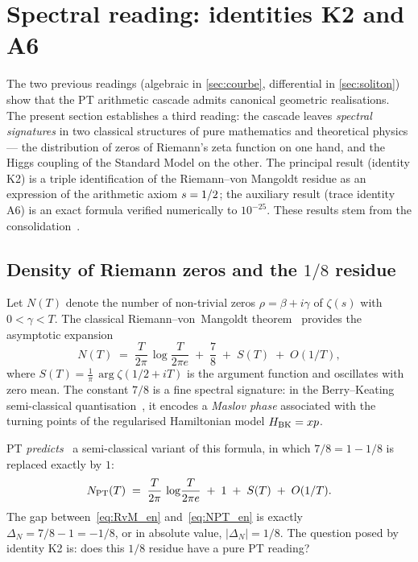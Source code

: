 \section{Spectral reading: identities K2 and A6}
\label{sec:spectrales}

The two previous readings (algebraic in \ref{sec:courbe}, differential in \ref{sec:soliton}) show that the PT arithmetic cascade admits canonical geometric realisations. The present section establishes a third reading: the cascade leaves \emph{spectral signatures} in two classical structures of pure mathematics and theoretical physics --- the distribution of zeros of Riemann's zeta function on one hand, and the Higgs coupling of the Standard Model on the other. The principal result (identity K2) is a triple identification of the Riemann--von Mangoldt residue as an expression of the arithmetic axiom $s = 1/2$; the auxiliary result (trace identity A6) is an exact formula verified numerically to $10^{-25}$. These results stem from the consolidation~\cite{PT_NewMath_Consolidation}.

\subsection{Density of Riemann zeros and the \texorpdfstring{$1/8$}{1/8} residue}
\label{sec:spectrales:RvM}

Let $N(T)$ denote the number of non-trivial zeros $\rho = \beta + i\gamma$ of $\zeta(s)$ with $0 < \gamma < T$. The classical Riemann--von~Mangoldt theorem~\cite{Edwards1974} provides the asymptotic expansion
\begin{equation}
N(T) \;=\; \dfrac{T}{2\pi}\,\log\!\dfrac{T}{2\pi e} \;+\; \dfrac{7}{8} \;+\; S(T) \;+\; O(1/T),
\label{eq:RvM_en}
\end{equation}
where $S(T) = \frac{1}{\pi}\,\arg \zeta(1/2 + iT)$ is the argument function and oscillates with zero mean. The constant $7/8$ is a fine spectral signature: in the Berry--Keating semi-classical quantisation~\cite{BerryKeating1999}, it encodes a \emph{Maslov phase} associated with the turning points of the regularised Hamiltonian model $H_{\rm BK} = xp$.

PT \emph{predicts}~\cite{PT_NewMath_Consolidation} a semi-classical variant of this formula, in which $7/8 = 1 - 1/8$ is replaced exactly by $1$:
\begin{equation}
N_{\rm PT}(T) \;=\; \dfrac{T}{2\pi}\,\log\!\dfrac{T}{2\pi e} \;+\; 1 \;+\; S(T) \;+\; O(1/T).
\label{eq:NPT_en}
\end{equation}
The gap between~\eqref{eq:RvM_en} and~\eqref{eq:NPT_en} is exactly $\Delta_N = 7/8 - 1 = -1/8$, or in absolute value, $|\Delta_N| = 1/8$. The question posed by identity K2 is: does this $1/8$ residue have a pure PT reading?

